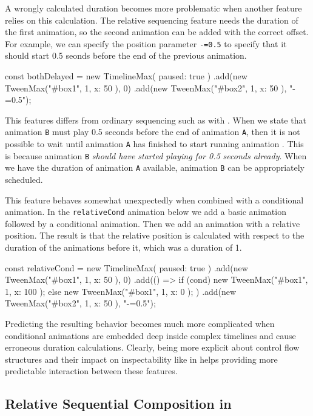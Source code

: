 A wrongly calculated duration becomes more problematic when another feature relies on this calculation. The relative sequencing feature needs the duration of the first animation, so the second animation can be added with the correct offset. For example, we can specify the position parameter \texttt{-=0.5} to specify that it should start 0.5 seonds before the end of the previous animation.

\begin{js}
const bothDelayed = new TimelineMax({ paused: true })
  .add(new TweenMax("#box1", 1, { x: 50 }), 0)
  .add(new TweenMax("#box2", 1, { x: 50 }), "-=0.5");
\end{js}


This features differs from ordinary sequencing such as with . When we state that animation \texttt{B} must play 0.5 seconds before the end of animation \texttt{A}, then it is not possible to wait until animation \texttt{A} has finished to start running animation . This is because animation \texttt{B} \emph{should have started playing for 0.5 seconds already}. When we have the duration of animation \texttt{A} available, animation \texttt{B} can be appropriately scheduled.

This feature behaves somewhat unexpectedly when combined with a
conditional animation. In the \texttt{relativeCond} animation below we add a
basic animation followed by a conditional animation. Then we add an animation
with a relative position. The result is that the relative position is
calculated with respect to the duration of the animations before it, which was
a duration of 1.

\begin{js}
const relativeCond = new TimelineMax({ paused: true })
  .add(new TweenMax("#box1", 1, { x: 50 }), 0)
  .add(() => { if (cond) { new TweenMax("#box1", 1, { x: 100 });
               } else { new TweenMax("#box1", 1, { x: 0 }); } })
  .add(new TweenMax("#box2", 1, { x: 50 }), "-=0.5");
\end{js}

Predicting the resulting behavior becomes much more complicated when
conditional animations are embedded deep inside complex timelines and cause
erroneous duration calculations.  Clearly, being more explicit about control
flow structures and their impact on inspectability like in \dsl{} helps
providing more predictable interaction between these features.

\subsection{Relative Sequential Composition in \dsl{}}

